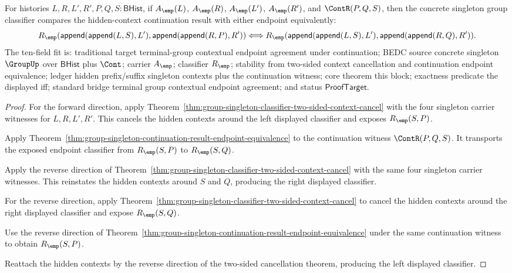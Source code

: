 \begin{theorem}
\label{thm:group-singleton-contextual-continuation-result-endpoint-equivalence}
For histories $L,R,L',R',P,Q,S:\mathsf{BHist}$, if $A_{\emp}(L)$,
$A_{\emp}(R)$, $A_{\emp}(L')$, $A_{\emp}(R')$, and $\ContR(P,Q,S)$, then
the concrete singleton group classifier compares the hidden-context
continuation result with either endpoint equivalently:
$$
R_{\emp}(\mathsf{append}(\mathsf{append}(L,S),L'),
\mathsf{append}(\mathsf{append}(R,P),R'))
\Longleftrightarrow
R_{\emp}(\mathsf{append}(\mathsf{append}(L,S),L'),
\mathsf{append}(\mathsf{append}(R,Q),R')).
$$
The ten-field fit is: traditional target terminal-group contextual endpoint
agreement under continuation; BEDC source concrete singleton $\GroupUp$ over
$\mathsf{BHist}$ plus $\Cont$; carrier $A_{\emp}$; classifier $R_{\emp}$;
stability from two-sided context cancellation and continuation endpoint
equivalence; ledger hidden prefix/suffix singleton contexts plus the
continuation witness; core theorem this block; exactness predicate the
displayed iff; standard bridge terminal group contextual endpoint agreement;
and status $\mathsf{ProofTarget}$.
\end{theorem}
\begin{proof}
For the forward direction, apply
Theorem~\ref{thm:group-singleton-classifier-two-sided-context-cancel} with the
four singleton carrier witnesses for $L,R,L',R'$. This cancels the hidden
contexts around the left displayed classifier and exposes $R_{\emp}(S,P)$.

Apply Theorem~\ref{thm:group-singleton-continuation-result-endpoint-equivalence}
to the continuation witness $\ContR(P,Q,S)$. It transports the exposed
endpoint classifier from $R_{\emp}(S,P)$ to $R_{\emp}(S,Q)$.

Apply the reverse direction of
Theorem~\ref{thm:group-singleton-classifier-two-sided-context-cancel} with the
same four singleton carrier witnesses. This reinstates the hidden contexts
around $S$ and $Q$, producing the right displayed classifier.

For the reverse direction, apply
Theorem~\ref{thm:group-singleton-classifier-two-sided-context-cancel} to cancel
the hidden contexts around the right displayed classifier and expose
$R_{\emp}(S,Q)$.

Use the reverse direction of
Theorem~\ref{thm:group-singleton-continuation-result-endpoint-equivalence} under
the same continuation witness to obtain $R_{\emp}(S,P)$.

Reattach the hidden contexts by the reverse direction of the two-sided
cancellation theorem, producing the left displayed classifier.
\end{proof}

